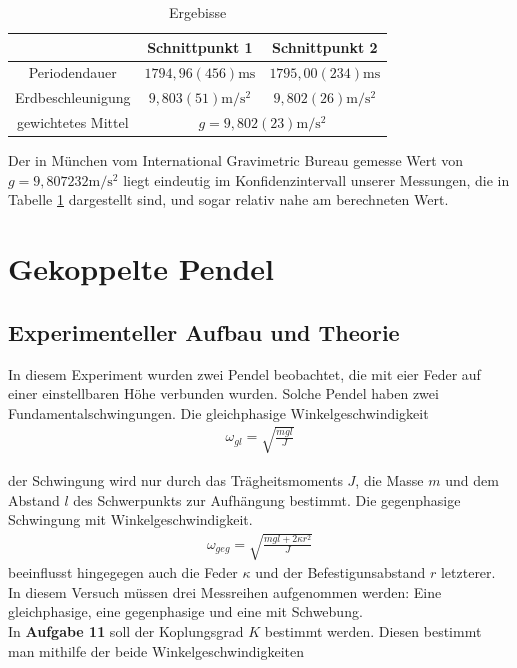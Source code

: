 \documentclass[11pt, a4paper]{article}
\begin{document}
    \begin{table}
        \centering
        \begin{tabular}{c c c}
            & Schnittpunkt 1 & Schnittpunkt 2 \\ \hline
            Periodendauer &  $1794,96(456)\si{\milli\second} $ & $1795,00(234)\si{\milli\second} $ \\
            Erdbeschleunigung & $9,803(51)\si{\metre\per\second\squared}$ & $9,802(26)\si{\metre\per\second\squared}$ \\
            gewichtetes Mittel & \multicolumn{2}{c}{$g = 9,802(23)\si{\metre\per\square\second}$}
        \end{tabular}
        \caption{Ergebisse}
        \label{ergrev}
    \end{table}

    
    Der in München vom International Gravimetric Bureau gemesse Wert von $g = 9,807232\si{\metre\per\second\squared}$ \cite{glit} liegt
    eindeutig im Konfidenzintervall unserer Messungen, die in Tabelle \ref{ergrev} dargestellt sind, und sogar relativ nahe am berechneten Wert.


    \section{Gekoppelte Pendel}

    \subsection{Experimenteller Aufbau und Theorie}

    In diesem Experiment wurden zwei Pendel beobachtet, die mit eier Feder auf einer einstellbaren Höhe
    verbunden wurden. Solche Pendel haben zwei Fundamentalschwingungen. 
    Die gleichphasige Winkelgeschwindigkeit 
    \begin{align}
        \omega_{gl} = \sqrt{\frac{mgl}{J}}
    \end{align}
    
    der Schwingung
    wird nur durch das Trägheitsmoments $J$, die Masse $m$ und dem Abstand $l$ des Schwerpunkts zur Aufhängung bestimmt.
    Die gegenphasige Schwingung mit Winkelgeschwindigkeit. 
    \begin{align}
        \omega_{geg} = \sqrt{\frac{mgl+2\kappa r^2}{J}}
    \end{align}
    beeinflusst hingegegen auch die Feder $\kappa$ und der Befestigunsabstand $r$ letzterer.
    In diesem Versuch müssen drei Messreihen aufgenommen werden: Eine gleichphasige, eine gegenphasige und
    eine mit Schwebung. \\
    In \textbf{Aufgabe 11} soll der Koplungsgrad $K$ bestimmt werden. Diesen bestimmt man mithilfe der beide
    Winkelgeschwindigkeiten
\end{document}
